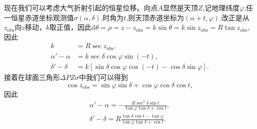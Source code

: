 \documentclass[11pt, a4paper, oneside]{ctexart}
\numberwithin{equation}{subsection}
\begin{document}
现在我们可以考虑大气折射引起的恒星位移。向点$A$显然是天顶$Z$,记地理纬度$\varphi$,任一恒星赤道坐标观测值$\sigma\left(\alpha,\delta{}\right)$,时角为$t$,则天顶赤道坐标为$\left(\alpha+t,\varphi\right)$.改正是从$z_{\text{obs}}$向$z$移动，$k$取正值，因此$\mathrm{d}\theta=\rho=z-z_{\text{obs}}=k\sin\theta=k\sin z_{\text{obs}}=R\tan z_{\text{obs}}$,因此
\begin{align}
k&=R\sec z_{\text{obs}}.\\
\alpha'-\alpha&=k\sec\delta\cos\varphi\sin\left(-t\right),\\
\delta'-\delta&=k\left[\sin\delta\cos\varphi\cos\left(-t\right)-\cos\delta\sin\varphi\right].
\end{align}
接着在球面三角形$\Delta{}PZ\sigma$中我们可以得到
\begin{equation}
\cos z_{\text{obs}}=\sin\varphi\sin\delta+\cos\varphi\cos\delta\cos t,
\end{equation}
因此
\begin{align}
\alpha'-\alpha=-\frac{R\sec^2\delta\sin t}{\tan\varphi\tan\delta+\cos t},\\
\delta'-\delta=R\frac{\tan\delta\cos t-\tan\varphi}{\tan\varphi\tan\delta+\cos t}.
\end{align}
\end{document}
